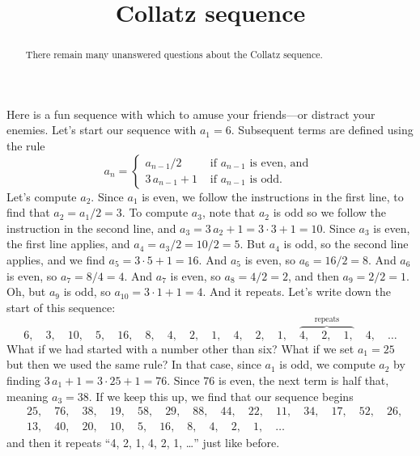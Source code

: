 \documentclass{ximera}
\title{Collatz sequence}
\begin{document}
\begin{abstract}
  There remain many unanswered questions about the Collatz sequence.
\end{abstract}

\maketitle

Here is a fun sequence with which to amuse your friends---or distract
your enemies.  Let's start our sequence with $a_1 = 6$.  Subsequent
terms are defined using the rule
$$
a_n = \begin{cases} a_{n-1} / 2 & \mbox{ if $a_{n-1}$ is even, and } \\
3 \, a_{n-1} + 1 & \mbox{ if $a_{n-1}$ is odd.}
\end{cases}
$$
Let's compute $a_2$.  Since $a_1$ is even, we follow the instructions
in the first line, to find that $a_2 = a_1/2 = 3$. To compute $a_3$,
note that $a_2$ is odd so we follow the instruction in the second
line, and $a_3 = 3 \, a_2 + 1 = 3 \cdot 3 + 1 = 10$.  Since $a_3$ is
even, the first line applies, and $a_4 = a_3 / 2 = 10 / 2 = 5$.  But
$a_4$ is odd, so the second line applies, and we find $a_5 = 3 \cdot 5
+ 1 = 16$.  And $a_5$ is even, so $a_6 = 16 / 2 = 8$.  And $a_6$ is
even, so $a_7 = 8/4 = 4$.  And $a_7$ is even, so $a_8 = 4 / 2 = 2$,
and then $a_9 = 2/2 = 1$.  Oh, but $a_9$ is odd, so $a_{10} = 3 \cdot
1 + 1 = 4$.  And it repeats.  Let's write down the start of this sequence:
$$
6,\quad %
3,\quad %
10,\quad  %
5,\quad  %
16,\quad  %
8,\quad  %
4,\quad  %
2,\quad  %
1,\quad  %
4,\quad %
2,\quad %
1,\quad %
\overbrace{4,\quad %
2,\quad %
1,}^{\mbox{repeats}}\quad %
4,\quad %
\ldots
$$
What if we had started with a number other than six?  What if we set
$a_1 = 25$ but then we used the same rule?  In that case, since $a_1$
is odd, we compute $a_2$ by finding $3 \, a_1 + 1 = 3 \cdot 25 + 1 =
76$.  Since $76$ is even, the next term is half that, meaning $a_3 =
38$.  If we keep this up, we find that our sequence begins
\begin{align*}
&25,\quad 76,\quad 38,\quad 19,\quad 58,\quad 29,\quad 88,\quad 44,\quad 22,\quad 11,\quad 34,\quad 17,\quad 52,\quad 26, \\
&13,\quad 40,\quad 20,\quad 10,\quad 5,\quad 16,\quad 8,\quad 4,\quad 2, \quad 1, \quad \ldots
\end{align*}
and then it repeats ``4, 2, 1, 4, 2, 1, \ldots'' just like before.
\end{document}
